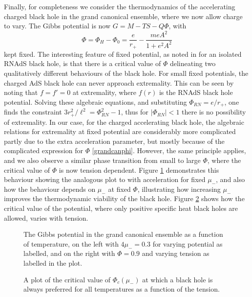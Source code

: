 \documentclass[
twoside,openright,frontopenright]{dmathesis}
\begin{document}
Finally, for completeness we consider the thermodynamics of the accelerating
charged black hole in the grand canonical ensemble, where we now allow charge to
vary. The Gibbs potential is now $G=M-TS-Q\Phi$, with
\begin{equation}
\Phi = \Phi_H - \Phi_0
= \frac{e}{r_+} - \frac{meA^2}{1+e^2A^2} 
\label{grandcanphi}
\end{equation}
kept fixed. The interesting feature of fixed potential, as noted in
\cite{Chamblin:1999tk} for an isolated RNAdS black hole, is that there is a
critical value of $\Phi$ delineating two qualitatively different behaviours of
the black hole.  For small fixed potentials, the charged AdS black hole can
never approach extremality. This can be seen by noting that $f=f'=0$ at
extremality, where $f(r)$ is the RNAdS black hole potential. Solving these
algebraic equations, and substituting $\Phi_{RN} = e/r_+$, one finds the
constraint $3r_+^2 /\ell^2= \Phi_{RN}^2-1$, thus for $|\Phi_{RN}|<1$ there is no
possibility of extremality. In our case, for the charged accelerating black
hole, the algebraic relations for extremality at fixed potential are
considerably more complicated partly due to the extra acceleration parameter,
but mostly because of the complicated expression for $\Phi$
\eqref{grandcanphi}. However, the same principle applies, and we also observe a
similar phase transition from small to large $\Phi$, where the critical value of
$\Phi$ is now tension dependent. Figure \ref{fig:grand} demonstrates this
behaviour showing the analogous plot to \cite{Chamblin:1999tk} with acceleration
for fixed $\mu_-$, and also how the behaviour depends on $\mu_-$ at fixed
$\Phi$, illustrating how increasing $\mu_-$ improves the thermodynamic viability
of the black hole.  Figure \ref{fig:phicrit} shows how the critical value of the
potential, where only positive specific heat black holes are allowed, varies
with tension.
\begin{figure}
\caption{The Gibbs potential in the grand canonical ensemble
as a function of temperature, on the left with $4\mu_- = 0.3$
for varying potential as labelled, and on the right with $\Phi=0.9$
and varying tension as labelled in the plot.
}
\label{fig:grand}
\end{figure}

\begin{figure} 
\caption{A plot of the critical value of $\Phi_c(\mu_-)$ at which a black hole
is always preferred for all temperatures as a function of the tension. 
}
\label{fig:phicrit}
\end{figure}
\end{document}
